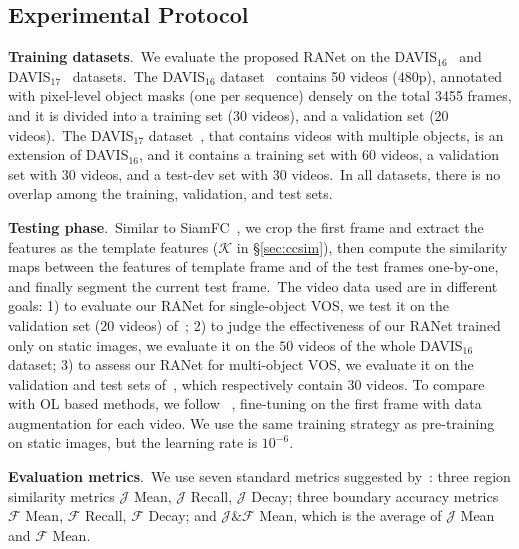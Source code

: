 \documentclass[10pt,twocolumn,letterpaper]{article}
\begin{document}
\subsection{Experimental Protocol}
\label{sec:protocol}

\noindent
\textbf{Training datasets}.\ We evaluate the proposed RANet on the DAVIS$_{16}$~\cite{davis2016} and DAVIS$_{17}$~\cite{davis2017} datasets.\ The DAVIS$_{16}$ dataset~\cite{davis2016} contains 50 videos ($480$p), annotated with pixel-level object masks (one per sequence) densely on the total 3455 frames, and it is divided into a training set ($30$ videos), and a validation set ($20$ videos).\ The DAVIS$_{17}$ dataset~\cite{davis2017}, that contains videos with multiple objects, is an extension of DAVIS$_{16}$, and it contains a training set with $60$ videos, a validation set with $30$ videos, and a test-dev set with $30$ videos.\ In all datasets, there is no overlap among the training, validation, and test sets.


\noindent
\textbf{Testing phase}.\
Similar to SiamFC~\cite{siamfc}, we crop the first frame and extract the features as the template features ($\mathcal{K}$ in \S\ref{sec:ccsim}), then compute the similarity maps between the features of template frame and of the test frames one-by-one, and finally segment the current test frame.\ The video data used are in different goals: 1) to evaluate our RANet for single-object VOS, we test it on the validation set ($20$ videos) of~\cite{davis2016}; 2) to judge the effectiveness of our RANet trained only on static images, we evaluate it on the $50$ videos of the whole DAVIS$_{16}$ dataset; 3)
to assess our RANet for multi-object VOS, we evaluate it on the validation and test sets of~\cite{davis2017}, which respectively contain $30$ videos. 
To compare with OL based methods, we follow ~\cite{osvos,masktrack}, fine-tuning on the first frame with data augmentation for each video. We use the same training strategy as pre-training on static images, but the learning rate is $10^{-6}$. 







\noindent
\textbf{Evaluation metrics}.\ We use seven standard metrics suggested by~\cite{davis2016}: three region similarity metrics $\mathcal{J}$ Mean, $\mathcal{J}$ Recall, $\mathcal{J}$ Decay; three boundary accuracy metrics $\mathcal{F}$ Mean, $\mathcal{F}$ Recall, $\mathcal{F}$ Decay; and $\mathcal{J}\&\mathcal{F}$ Mean, which is the average of $\mathcal{J}$ Mean and $\mathcal{F}$ Mean.
\end{document}
